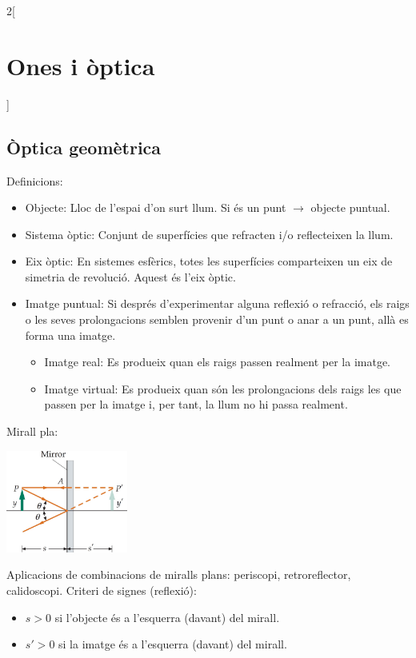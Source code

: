 \documentclass[class=article,10pt,crop=false]{standalone}
\begin{document}
\begin{multicols}{2}[\section{Ones i òptica}]
\subsection{Òptica geomètrica}
Definicions:
\begin{itemize}
    \item Objecte: Lloc de l'espai d'on surt llum. Si és un punt $\rightarrow$ objecte puntual.
    \item Sistema òptic: Conjunt de superfícies que refracten i/o reflecteixen la llum.
    \item Eix òptic: En sistemes esfèrics, totes les superfícies comparteixen un eix de simetria de revolució. Aquest és l'eix òptic.
    \item Imatge puntual: Si després d'ex\-pe\-ri\-men\-tar alguna reflexió o refracció, els raigs o les seves prolongacions semblen provenir d'un punt o anar a un punt, allà es forma una imatge.
    \begin{itemize}
        \item Imatge real: Es produeix quan els raigs passen realment per la imatge.
        \item Imatge virtual: Es produeix quan són les prolongacions dels raigs les que passen per la imatge i, per tant, la llum no hi passa realment.
    \end{itemize}
\end{itemize}
Mirall pla:\newline
\begin{minipage}{\linewidth}
    \centering
    \includegraphics[width=4cm]{Physics/1st/Waves_and_optics/Images/pla.jpg} 
\end{minipage}
Aplicacions de combinacions de miralls plans: periscopi, retroreflector, calidoscopi.\newline
Criteri de signes (reflexió): 
\begin{itemize}
    \item $s>0$ si l'objecte és a l'esquerra (davant) del mirall.
    \item $s'>0$ si la imatge és a l'esquerra (davant) del mirall.

\end{itemize}
\end{multicols}
\end{document}
